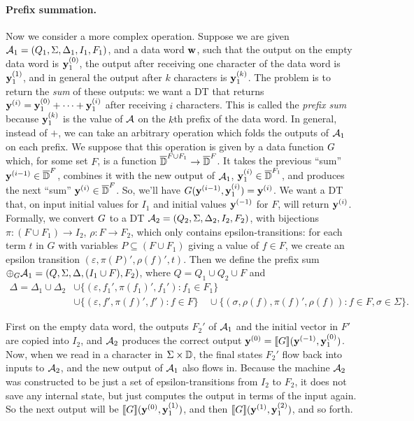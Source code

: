 \paragraph*{Prefix summation.}
Now we consider a more complex operation. Suppose we are given $\mathcal{A}_1 = (Q_{1}, \Sigma, \Delta_{1}, I_{1}, F_{1})$, and a data word $\textbf{w}$, such that the output on the empty data word is $\textbf{y}^{(0)}_1$, the output after receiving one character of the data word is $\textbf{y}^{(1)}_1$, and in general the output after $k$ characters is $\textbf{y}^{(k)}_1$. The problem is to return the \emph{sum} of these outputs: we want a DT that returns $\textbf{y}^{(i)} = \textbf{y}^{(0)}_1 + \cdots + \textbf{y}^{(i)}_1$ after receiving $i$ characters. This is called the \emph{prefix sum} because $\textbf{y}^{(k)}_1$ is the value of $\mathcal{A}$ on the $k$th prefix of the data word.
In general, instead of $+$, we can take an arbitrary operation which folds the outputs of $\mathcal{A}_1$ on each prefix. We suppose that this operation is given by a data function $G$ which, for some set $F$, is a function $\overline{\mathbb{D}{}}^{F \cup F_1} \to \overline{\mathbb{D}{}}^{F}$. It takes the previous ``sum'' $\textbf{y}^{(i-1)} \in \overline{\mathbb{D}{}}^F$, combines it with the new output of $\mathcal{A}_1$, $\textbf{y}_1^{(i)} \in \overline{\mathbb{D}{}}^{F_1}$, and produces the next ``sum'' $\textbf{y}^{(i)} \in \overline{\mathbb{D}{}}^F$. So, we'll have $G(\textbf{y}^{(i-1)},\textbf{y}_1^{(i)}) = \textbf{y}^{(i)}$. We want a DT that, on input initial values for $I_1$ and initial values $\textbf{y}^{(-1)}$ for $F$, will return $\textbf{y}^{(i)}$.
Formally, we convert $G$ to a DT $\mathcal{A}_2 = (Q_{2}, \Sigma, \Delta_{2}, I_{2}, F_{2})$, with bijections $\pi: (F \cup F_1) \to I_2$, $\rho: F \to F_2$, which only contains epsilon-transitions: for each term $t$ in $G$ with variables $P \subseteq (F \cup F_1)$ giving a value of $f \in F$, we create an epsilon transition $(\varepsilon, \pi(P)', \rho(f)', t)$. Then we define the prefix sum $\prefixsum{\DT_1}{\DF} = (Q, \Sigma, \Delta, (I_1 \cup F), F_2)$, where $Q = Q_1 \cup Q_2 \cup F$ and
\begin{align*}
\Delta = \Delta_1 \cup \Delta_2
    &\cup \big\{(\varepsilon, f_1', \pi(f_1)', f_1') : f_1 \in F_1 \big\} \\
    &\cup \big\{(\varepsilon, f', \pi(f)', f') : f \in F \big\}
    \quad \cup \big\{(\sigma, \rho(f), \pi(f)', \rho(f)) : f \in F, \sigma \in \Sigma \big\}.
\end{align*}

First on the empty data word, the outputs $F_2'$ of $\mathcal{A}_1$ and the initial vector in $F'$ are copied into $I_2$, and $\mathcal{A}_2$ produces the correct output $\textbf{y}^{(0)} = \llbracket G \rrbracket(\textbf{y}^{(-1)},\textbf{y}_1^{(0)})$. Now, when we read in a character in $\Sigma \times \mathbb{D}$, the final states $F_2'$ flow back into inputs to $\mathcal{A}_2$, and the new output of $\mathcal{A}_1$ also flows in. Because the machine $\mathcal{A}_2$ was constructed to be just a set of epsilon-transitions from $I_2$ to $F_2$, it does not save any internal state, but just computes the output in terms of the input again. So the next output will be $\llbracket G \rrbracket(\textbf{y}^{(0)},\textbf{y}_1^{(1)})$, and then $\llbracket G \rrbracket(\textbf{y}^{(1)},\textbf{y}_1^{(2)})$, and so forth.

